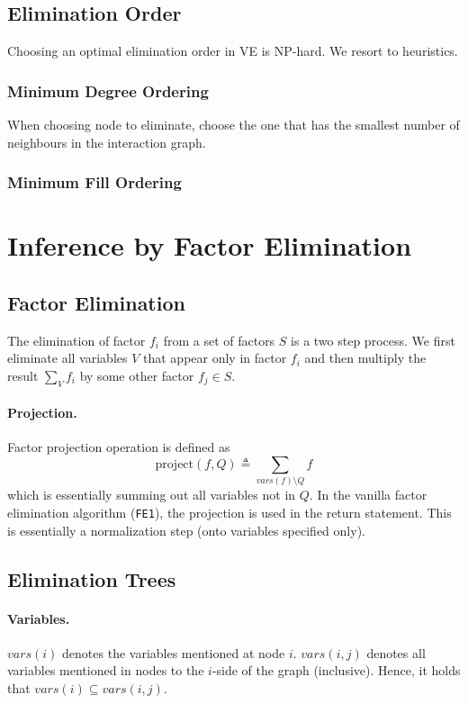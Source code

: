 \documentclass[11pt]{article}
\begin{document}
\subsection{Elimination Order} Choosing an optimal elimination order in VE is NP-hard. We resort to heuristics. 

\subsubsection{Minimum Degree Ordering}
When choosing node to eliminate, choose the one that has the smallest number of neighbours in the interaction graph. 

\subsubsection{Minimum Fill Ordering}

\section{Inference by Factor Elimination}
\subsection{Factor Elimination}
The elimination of factor $f_i$ from a set of factors $S$ is a two step process. We first eliminate all variables $V$ that appear only in factor $f_i$ and then multiply the result $\sum_V f_i$ by some other factor $f_j \in S$. 

\paragraph{Projection.} Factor projection operation is defined as 
\begin{equation}
	\mathrm {project} (f, Q) \triangleq \sum_{vars(f) \setminus Q} f
\end{equation}
which is essentially summing out all variables not in $Q$. In the vanilla factor elimination algorithm (\texttt{FE1}), the projection is used in the return statement. This is essentially a normalization step (onto variables specified only).

\subsection{Elimination Trees\label{sec:elimination tree}}
\paragraph{Variables.}
$vars(i)$ denotes the variables mentioned at node $i$. $vars(i, j)$ denotes all variables mentioned in nodes to the $i$-side of the graph (inclusive). Hence, it holds that $vars(i) \subseteq vars(i, j)$.
\end{document}
